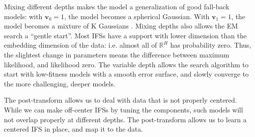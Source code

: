 \documentclass[reprint,amsmath,amssymb,aps,prl]{revtex4-1}
\newcommand{\R}{\mathbb{R}}
\newcommand{\bv}{\boldsymbol v}
\begin{document}
Mixing different depths makes the model a generalization of good fall-back models: with $\bv_0 = 1$, the model becomes a spherical Gaussian. With $\bv_1 = 1$, the model becomes a mixture of K Gaussians \footnotemark[2]. Mixing depths also allows the EM search a ``gentle start''. Most IFSs have a support with lower dimension than the embedding dimension of the data: i.e. almost all of $\R^H$ has probability zero. Thus, the slightest change in parameters means the difference between maximum likelihood, and likelihood zero. The variable depth allows the search algorithm to start with low-fitness models with a smooth error surface, and slowly converge to the more challenging, deeper models.

The post-transform allows us to deal with data that is not properly centered. While we can make off-center IFSs by tuning the components, such models will not overlap properly at different depths. The post-transform allows us to learn a centered IFS in place, and map it to the data.

\end{document}
